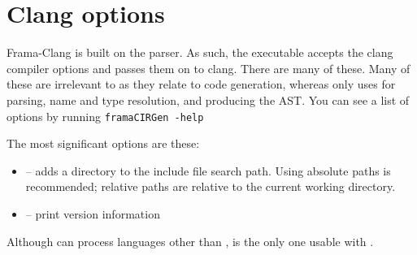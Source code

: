\section{Clang options}

Frama-Clang is built on the \clang \cpp parser. 
As such, the \irg executable accepts the clang
compiler options and passes them on to clang. There are many of these.
Many of these are irrelevant to \fcl as they relate to 
code generation, whereas \fcl only uses \clang for parsing, name
and type resolution, and producing the AST.
You can see a list of options by running 
\lstinline|framaCIRGen -help|

The most significant \cl options are these:
\begin{itemize}
	\item {} -- adds a directory to the include file search path. Using absolute paths is recommended; relative paths are relative to the current working directory.
	\item {} -- print version information
\end{itemize}

Although \clang can process languages other than \cpp, \cpp is the only one usable with \fclang.

%

